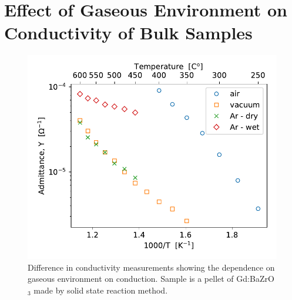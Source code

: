 \vspace{12pt}
\section{Effect of Gaseous Environment on Conductivity of Bulk Samples}

\begin{figure}
\centering
\includegraphics{Figures/bzgxs10-gas-env-comparison-2.pdf}
  \caption{Difference in conductivity measurements showing the dependence on gaseous environment on conduction. Sample is a pellet of Gd:BaZrO$_3$ made by solid state reaction method.}
  \label{target:fig:gas_comp}
\end{figure}

